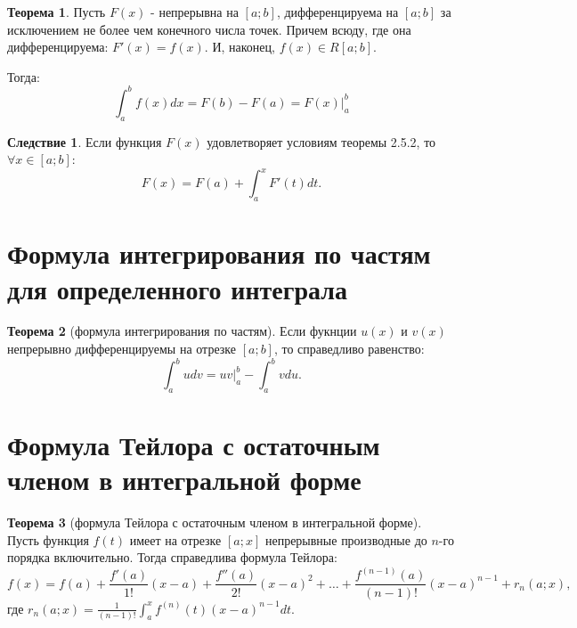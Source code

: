 \documentclass{report}
\theoremstyle{definition}
\newtheorem*{effect}{Следствие}
\newtheorem*{theorem}{Теорема}
\begin{document}
\begin{theorem}
    Пусть $F(x)$ - непрерывна на $[a;b]$, дифференцируема на $[a;b]$
    за исключением не более чем конечного числа точек. Причем всюду, где
    она дифференцируема: $F'(x) = f(x)$. И, наконец, $f(x)\in R[a;b]$.

    Тогда:
    \begin{equation*}
        \int_{a}^{b}f(x)dx = F(b) - F(a) = F(x)|_{a}^{b}
    \end{equation*}
\end{theorem}

\begin{effect}
    Если функция $F(x)$ удовлетворяет условиям теоремы 2.5.2, то $\forall x \in [a;b]:$
    \begin{equation*}
        F(x) = F(a) + \int_{a}^{x}F'(t)dt.
    \end{equation*}
\end{effect}

\section{Формула интегрирования по частям для определенного интеграла}

\begin{theorem}[формула интегрирования по частям]
    Если фукнции $u(x)$ и $v(x)$ непрерывно дифференцируемы на отрезке $[a;b]$, то
    справедливо равенство:
    \begin{equation*}
        \int_{a}^{b}udv = uv|_{a}^{b} - \int_{a}^{b}vdu.
    \end{equation*}
\end{theorem}

\section{Формула Тейлора с остаточным членом в интегральной форме}

\begin{theorem}[формула Тейлора с остаточным членом в интегральной форме]
    Пусть функция $f(t)$ имеет на отрезке $[a;x]$ непрерывные производные до
    $n$-го порядка включительно. Тогда справедлива формула Тейлора:
    \begin{equation*}
        f(x) = f(a) + \frac{f'(a)}{1!}(x-a) + \frac{f''(a)}{2!}(x-a)^{2} + \ldots +
        \frac{f^{(n-1)}(a)}{(n-1)!}(x-a)^{n-1} + r_{n}(a;x),
    \end{equation*}
    где $r_{n}(a;x) = \frac{1}{(n-1)!}\int_{a}^{x}f^{(n)}(t)(x-a)^{n-1}dt$.
\end{theorem}
\end{document}
